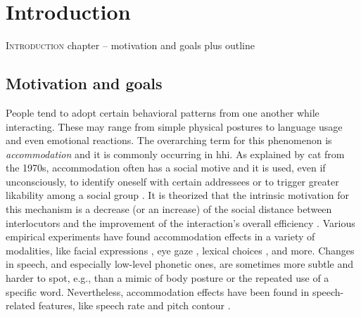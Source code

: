 \chapter{Introduction}
\label{chap:introduction}

\lettrine{I}{ntroduction} chapter -- motivation and goals plus outline

\pagebreak

\acresetall

\section{Motivation and goals}
\label{sec:motivation_and_goals}

People tend to adopt certain behavioral patterns from one another while interacting.
These may range from simple physical postures to language usage and even emotional reactions.
The overarching term for this phenomenon is \emph{accommodation} and it is commonly occurring in \acl{hhi}.
As explained by \acl{cat} from the 1970s, accommodation often has a social motive and it is used, even if unconsciously, to identify oneself with certain addressees or to trigger greater likability among a social group \citep{Giles2007CAT}.
It is theorized that the intrinsic motivation for this mechanism is a decrease (or an increase) of the social distance between interlocutors and the improvement of the interaction's overall efficiency \citep{Gallois2015CAT}.
Various empirical experiments have found accommodation effects in a variety of modalities, like facial expressions \citep{Kinsbourne2009embodied}, eye gaze \citep{Leong2017speaker}, lexical choices \citep{Brennan1996lexical}, and more.
Changes in speech, and especially low-level phonetic ones, are sometimes more subtle and harder to spot, e.g., than a mimic of body posture or the repeated use of a specific word.
Nevertheless, accommodation effects have been found in speech-related features, like speech rate \citep{Levitan2011measuring, Local2007phonetic} and pitch contour \citep{Babel2012role}.

